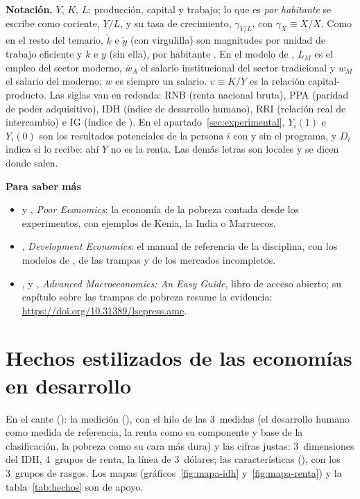 \documentclass[11pt]{article}
\begin{document}
\begin{anotaciones}
\textbf{Notación.} $Y$, $K$, $L$: producción, capital y trabajo; lo que es \emph{por habitante} se escribe como cociente, $Y/L$, y su tasa de crecimiento, $\gamma_{Y/L}$, con $\gamma_X\equiv\dot X/X$. Como en el resto del temario, $\tilde k$ e $\tilde y$ (con virgulilla) son magnitudes por unidad de trabajo eficiente y $k$ e $y$ (sin ella), por habitante . En el modelo de , $L_M$ es el empleo del sector moderno, $\overline w_A$ el salario institucional del sector tradicional y $w_M$ el salario del moderno; $w$ es siempre un salario. $v\equiv K/Y$ es la relación capital-producto. Las siglas van en redonda: RNB (renta nacional bruta), PPA (paridad de poder adquisitivo), IDH (índice de desarrollo humano), RRI (relación real de intercambio) e IG (índice de ). En el apartado~\ref{sec:experimental}, $Y_i(1)$ e $Y_i(0)$ son los resultados potenciales de la persona $i$ con y sin el programa, y $D_i$ indica si lo recibe: ahí $Y$ no es la renta. Las demás letras son locales y se dicen donde salen.
\end{anotaciones}

\begin{anotaciones}
\textbf{Para saber más}
\begin{itemize}
\item {} y , \emph{Poor Economics}: la economía de la pobreza contada desde los experimentos, con ejemplos de Kenia, la India o Marruecos\nocite{BanerjeeDuflo2011}.
\item {}, \emph{Development Economics}: el manual de referencia de la disciplina, con los modelos de , de las trampas y de los mercados incompletos\nocite{Ray1998}.
\item {},  y , \emph{Advanced Macroeconomics: An Easy Guide}, libro de acceso abierto; su capítulo sobre las trampas de pobreza resume la evidencia: \url{https://doi.org/10.31389/lsepress.ame}\nocite{Campante2021}.
\end{itemize}
\end{anotaciones}

\section{Hechos estilizados de las economías en desarrollo}\label{sec:desarrollo}

\begin{notaopositor}
En el cante (): la medición (), con el hilo de las 3~medidas (el desarrollo humano como medida de referencia, la renta como su componente y base de la clasificación, la pobreza como su cara más dura) y las cifras justas: 3~dimensiones del IDH, 4~grupos de renta, la línea de 3~dólares; las características (), con los 3~grupos de rasgos. Los mapas (gráficos~\ref{fig:mapa-idh} y~\ref{fig:mapa-renta}) y la tabla~\ref{tab:hechos} son de apoyo.
\end{notaopositor}
\end{document}
